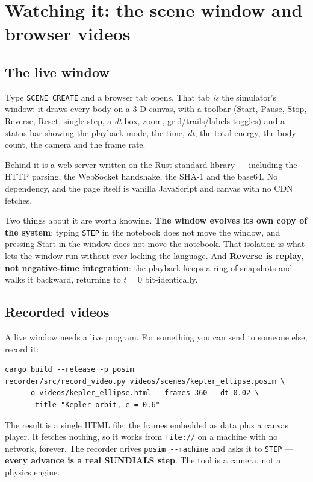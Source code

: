 \documentclass[11pt]{article}
\newcommand{\kw}[1]{\texttt{\uppercase{#1}}}
\newcommand{\code}[1]{\texttt{#1}}
\begin{document}
\section{Watching it: the scene window and browser videos}

\subsection{The live window}

Type \kw{scene create} and a browser tab opens. That tab \emph{is} the
simulator's window: it draws every body on a 3-D canvas, with a toolbar
(Start, Pause, Stop, Reverse, Reset, single-step, a \emph{dt} box, zoom,
grid/trails/labels toggles) and a status bar showing the playback mode,
the time, \emph{dt}, the total energy, the body count, the camera and
the frame rate.

Behind it is a web server written on the Rust standard library ---
including the HTTP parsing, the WebSocket handshake, the SHA-1 and the
base64. No dependency, and the page itself is vanilla JavaScript and
canvas with no CDN fetches.

Two things about it are worth knowing. \textbf{The window evolves its
own copy of the system}: typing \kw{step} in the notebook does not move
the window, and pressing Start in the window does not move the notebook.
That isolation is what lets the window run without ever locking the
language. And \textbf{Reverse is replay, not negative-time
integration}: the playback keeps a ring of snapshots and walks it
backward, returning to $t=0$ bit-identically.

\subsection{Recorded videos}

A live window needs a live program. For something you can send to
someone else, record it:

\begin{lstlisting}
cargo build --release -p posim
recorder/src/record_video.py videos/scenes/kepler_ellipse.posim \
     -o videos/kepler_ellipse.html --frames 360 --dt 0.02 \
     --title "Kepler orbit, e = 0.6"
\end{lstlisting}

The result is a single HTML file: the frames embedded as data plus a
canvas player. It fetches nothing, so it works from \code{file://} on a
machine with no network, forever. The recorder drives
\code{posim -{}-machine} and asks it to \kw{step} --- \textbf{every
advance is a real SUNDIALS step}. The tool is a camera, not a physics
engine.
\end{document}
